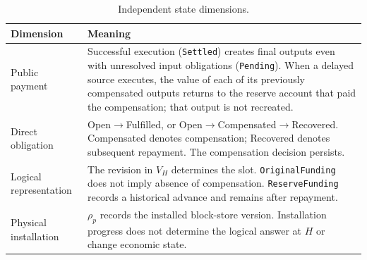 \begin{table}[!t]
\caption{Independent state dimensions.}
\label{tab:model-states}
\centering\small
\setlength{\tabcolsep}{3pt}
\begin{tabular}{@{}p{}p{}@{}}
\toprule
Dimension & Meaning \\
\midrule
Public payment &
Successful execution (\texttt{Settled}) creates final outputs even with unresolved input obligations (\texttt{Pending}). When a delayed source executes, the value of each of its previously compensated outputs returns to the reserve account that paid the compensation; that output is not recreated. \\

Direct obligation &
Open$\to$Fulfilled, or Open$\to$Compensated$\to$Recovered.
Compensated denotes compensation; Recovered denotes subsequent repayment.
The compensation decision persists. \\

Logical representation &
The revision in $V_H$ determines the slot.
\texttt{OriginalFunding} does not imply absence of compensation.
\texttt{ReserveFunding} records a historical advance and remains
after repayment. \\

Physical installation &
$\rho_p$ records the installed block-store version.
Installation progress does not determine the logical answer at $H$
or change economic state. \\
\bottomrule
\end{tabular}
\end{table}

